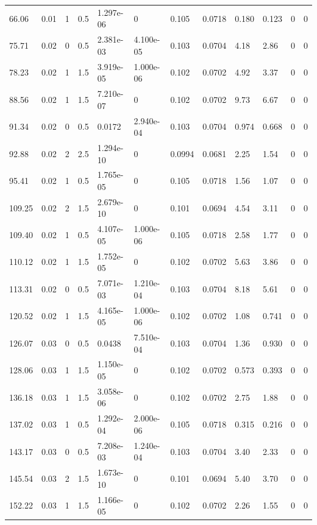 \documentclass[preview]{standalone}
\begin{document}
{{\begin{tabular}{L{1.2cm}C{1.2cm} C{0.3cm}C{0.5cm} C{1.4cm}C{1.4cm} C{1.4cm}C{1.4cm} C{1.6cm}C{1.6cm} C{1.6cm}C{1.6cm}}
  66.06  &  0.01  & 1     & 0.5 &  1.297e-06  & 0  &  0.105&   0.0718& 0.180 & 0.123   &  0 & 0  \\ 
  75.71  &  0.02  & 0     & 0.5 &  2.381e-03  & 4.100e-05  &  0.103&   0.0704& 4.18 & 2.86   &  0 & 0  \\ 
  78.23  &  0.02  & 1     & 1.5 &  3.919e-05  & 1.000e-06  &  0.102&   0.0702& 4.92 & 3.37   &  0 & 0  \\ 
  88.56  &  0.02  & 1     & 1.5 &  7.210e-07  & 0  &  0.102&   0.0702& 9.73 & 6.67   &  0 & 0  \\ 
  91.34  &  0.02  & 0     & 0.5 &  0.0172  & 2.940e-04  &  0.103&   0.0704& 0.974 & 0.668   &  0 & 0  \\ 
  92.88  &  0.02  & 2     & 2.5 &  1.294e-10  & 0  &  0.0994&   0.0681& 2.25 & 1.54   &  0 & 0  \\ 
  95.41  &  0.02  & 1     & 0.5 &  1.765e-05  & 0  &  0.105&   0.0718& 1.56 & 1.07   &  0 & 0  \\ 
  109.25  &  0.02  & 2     & 1.5 &  2.679e-10  & 0  &  0.101&   0.0694& 4.54 & 3.11   &  0 & 0  \\ 
  109.40  &  0.02  & 1     & 0.5 &  4.107e-05  & 1.000e-06  &  0.105&   0.0718& 2.58 & 1.77   &  0 & 0  \\ 
  110.12  &  0.02  & 1     & 1.5 &  1.752e-05  & 0  &  0.102&   0.0702& 5.63 & 3.86   &  0 & 0  \\ 
  113.31  &  0.02  & 0     & 0.5 &  7.071e-03  & 1.210e-04  &  0.103&   0.0704& 8.18 & 5.61   &  0 & 0  \\ 
  120.52  &  0.02  & 1     & 1.5 &  4.165e-05  & 1.000e-06  &  0.102&   0.0702& 1.08 & 0.741   &  0 & 0  \\ 
  126.07  &  0.03  & 0     & 0.5 &  0.0438  & 7.510e-04  &  0.103&   0.0704& 1.36 & 0.930   &  0 & 0  \\ 
  128.06  &  0.03  & 1     & 1.5 &  1.150e-05  & 0  &  0.102&   0.0702& 0.573 & 0.393   &  0 & 0  \\ 
  136.18  &  0.03  & 1     & 1.5 &  3.058e-06  & 0  &  0.102&   0.0702& 2.75 & 1.88   &  0 & 0  \\ 
  137.02  &  0.03  & 1     & 0.5 &  1.292e-04  & 2.000e-06  &  0.105&   0.0718& 0.315 & 0.216   &  0 & 0  \\ 
  143.17  &  0.03  & 0     & 0.5 &  7.208e-03  & 1.240e-04  &  0.103&   0.0704& 3.40 & 2.33   &  0 & 0  \\ 
  145.54  &  0.03  & 2     & 1.5 &  1.673e-10  & 0  &  0.101&   0.0694& 5.40 & 3.70   &  0 & 0  \\ 
  152.22  &  0.03  & 1     & 1.5 &  1.166e-05  & 0  &  0.102&   0.0702& 2.26 & 1.55   &  0 & 0  \\ 

\end{tabular}}}
\end{document}
